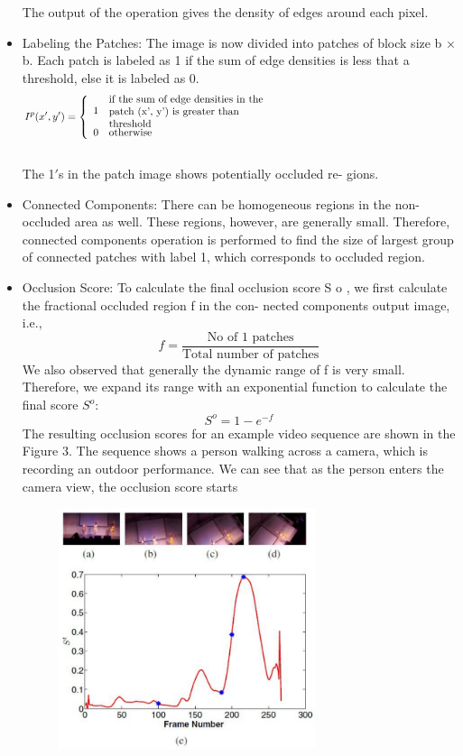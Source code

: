 \documentclass{sig-alternate-05-2015}
\begin{document}
\begin{itemize}
The output of the operation gives the density of edges around
each pixel.
    \item Labeling the Patches: The image is now divided into patches
of block size b × b. Each patch is labeled as 1 if the sum of
edge densities is less that a threshold, else it is labeled as 0.
\begin{equation}
I^p(x',y') = \left\{\begin{array}{ll}
    1 & \parbox{\textwidth}{if the sum of edge densities in the\\patch (x', y') is greater than\\ threshold}\\
    0 & \text{otherwise}\\
    \end{array}\right.
\end{equation}\\
The 1$'$s in the patch image shows potentially occluded re-
gions.
    \item Connected Components: There can be homogeneous regions
in the non-occluded area as well. These regions, however, are
generally small. Therefore, connected components operation
is performed to find the size of largest group of connected
patches with label 1, which corresponds to occluded region.
    \item Occlusion Score: To calculate the final occlusion score S o ,
we first calculate the fractional occluded region f in the con-
nected components output image, i.e.,
\begin{equation}
    f=\dfrac{\text{No of 1 patches}}{\text{Total number of patches}}
\end{equation}
We also observed that generally the dynamic range of f is very
small. Therefore, we expand its range with an exponential function
to calculate the final score $S^o$:
\begin{equation}
    S^o=1-e^{-f}
\end{equation}
The resulting occlusion scores for an example video sequence
are shown in the Figure 3. The sequence shows a person walking
across a camera, which is recording an outdoor performance. We
can see that as the person enters the camera view, the occlusion
score starts
\begin{figure}
\centering
\includegraphics[width=1\linewidth,height=200pt]{video_2.pdf}

\end{figure}
\end{itemize}
\end{document}
